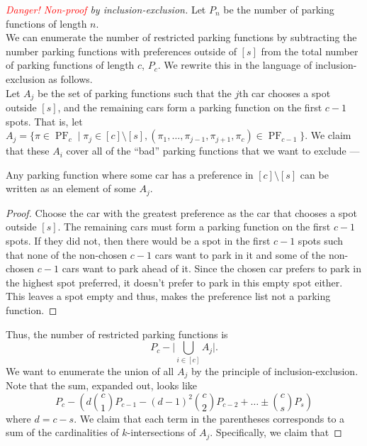 \begin{proof}[\textcolor{red}{Danger! Non-proof} by inclusion-exclusion]
	Let $P_{n}$ be the number of parking functions of length $n$. \\
	
	We can enumerate the number of restricted parking functions by subtracting the number parking functions with preferences outside of $[s]$ from the total number of parking functions of length $c$, $P_{c}$. We rewrite this in the language of inclusion-exclusion as follows. \\

	Let $A_{j}$ be the set of parking functions such that the $j$th car chooses a spot outside $[s]$, and the remaining cars form a parking function on the first $c - 1$ spots. That is, let $A_{j} = \{ \pi \in \operatorname{PF}_{c} \mid  \pi_{j} \in [c] \setminus [s], (\pi_{1}, \dots, \pi_{j - 1}, \pi_{j + 1}, \pi_{c}) \in \operatorname{PF}_{c - 1} \}$. We claim that these $A_{i}$ cover all of the ``bad'' parking functions that we want to exclude ---
	
	\begin{lemma}
		Any parking function where some car has a preference in $[c] \setminus [s]$ can be written as an element of some $A_{j}$.
	\end{lemma}
	
	\begin{proof}
		Choose the car with the greatest preference as the car that chooses a spot outside $[s]$. The remaining cars must form a parking function on the first $c - 1$ spots. If they did not, then there would be a spot in the first $c - 1$ spots such that none of the non-chosen $c - 1$ cars want to park in it and some of the non-chosen $c - 1$ cars want to park ahead of it. Since the chosen car prefers to park in the highest spot preferred, it doesn't prefer to park in this empty spot either. This leaves a spot empty and thus, makes the preference list not a parking function.
	\end{proof}
	
	Thus, the number of restricted parking functions is
	\[
		P_{c} - \lvert \bigcup_{i \in [c]} A_{j} \rvert.
	\]
	We want to enumerate the union of all $A_{j}$ by the principle of inclusion-exclusion. \\
	
	Note that the sum, expanded out, looks like
	\[
		P_{c} - \left ( d \binom{c}{1} P_{c - 1} - (d - 1)^{2} \binom{c}{2} P_{c - 2} + \dots \pm \binom{c}{s} P_{s} \right )
	\]
	where $d = c - s$. We claim that each term in the parentheses corresponds to a sum of the cardinalities of $k$-intersections of $A_{j}$. Specifically, we claim that


\end{proof}
